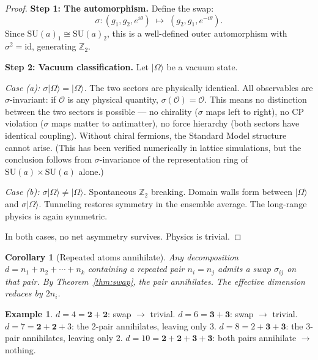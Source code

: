 \documentclass[12pt]{article}
\newtheorem{corollary}[theorem]{Corollary}
\theoremstyle{remark}
\theoremstyle{definition}
\newtheorem{example}[theorem]{Example}
\begin{document}
\begin{proof}
\textbf{Step 1: The automorphism.}
Define the swap:
\begin{equation}
\sigma: (g_1, g_2, e^{i\theta}) \;\mapsto\; (g_2, g_1, e^{-i\theta}).
\end{equation}
Since $\text{SU}(a)_1 \cong \text{SU}(a)_2$, this is a well-defined outer automorphism with $\sigma^2 = \text{id}$, generating $\mathbb{Z}_2$.

\textbf{Step 2: Vacuum classification.}
Let $|\Omega\rangle$ be a vacuum state.

\emph{Case (a): $\sigma|\Omega\rangle = |\Omega\rangle$.}
The two sectors are physically identical. All observables are $\sigma$-invariant: if $\mathcal{O}$ is any physical quantity, $\sigma(\mathcal{O}) = \mathcal{O}$. This means no distinction between the two sectors is possible --- no chirality ($\sigma$ maps left to right), no CP violation ($\sigma$ maps matter to antimatter), no force hierarchy (both sectors have identical coupling). Without chiral fermions, the Standard Model structure cannot arise. (This has been verified numerically in lattice simulations, but the conclusion follows from $\sigma$-invariance of the representation ring of $\text{SU}(a) \times \text{SU}(a)$ alone.)

\emph{Case (b): $\sigma|\Omega\rangle \neq |\Omega\rangle$.}
Spontaneous $\mathbb{Z}_2$ breaking. Domain walls form between $|\Omega\rangle$ and $\sigma|\Omega\rangle$. Tunneling restores symmetry in the ensemble average. The long-range physics is again symmetric.

In both cases, no net asymmetry survives. Physics is trivial.
\end{proof}

\begin{corollary}[Repeated atoms annihilate]
\label{cor:annihilate}
Any decomposition $d = n_1 + n_2 + \cdots + n_k$ containing a repeated pair $n_i = n_j$ admits a swap $\sigma_{ij}$ on that pair. By Theorem~\ref{thm:swap}, the pair annihilates. The effective dimension reduces by $2n_i$.
\end{corollary}

\begin{example}
$d = 4 = \mathbf{2+2}$: swap $\to$ trivial. \;
$d = 6 = \mathbf{3+3}$: swap $\to$ trivial. \;
$d = 7 = \mathbf{2+2}+3$: the 2-pair annihilates, leaving only 3. \;
$d = 8 = 2+\mathbf{3+3}$: the 3-pair annihilates, leaving only 2. \;
$d = 10 = \mathbf{2+2}+\mathbf{3+3}$: both pairs annihilate $\to$ nothing.
\end{example}
\end{document}
